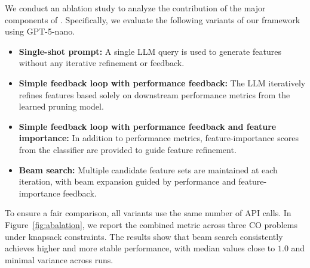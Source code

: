 We conduct an ablation study to analyze the contribution of the major components of \llm. Specifically, we evaluate the following variants of our framework using GPT-5-nano.

\begin{itemize}
    \item \textbf{Single-shot prompt:} A single LLM query is used to generate features without any iterative refinement or feedback.

    \item \textbf{Simple feedback loop with performance feedback:} The LLM iteratively refines features based solely on downstream performance metrics from the learned pruning model.

    \item \textbf{Simple feedback loop with performance feedback and feature importance:} In addition to performance metrics, feature-importance scores from the classifier are provided to guide feature refinement.

    \item \textbf{Beam search:} Multiple candidate feature sets are maintained at each iteration, with beam expansion guided by performance and feature-importance feedback.
\end{itemize}

To ensure a fair comparison, all variants use the same number of API calls. In Figure~\ref{fig:abalation}, we report the combined metric across three CO problems under knapsack constraints. The results show that beam search consistently achieves higher and more stable performance, with median values close to $1.0$ and minimal variance across runs.









